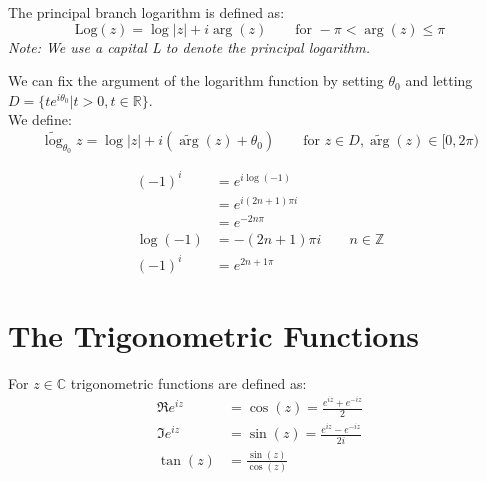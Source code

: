 \begin{definition}
    The principal branch logarithm is defined as:
    \[
        \text{Log}(z) = \log |z| + i \arg(z) \qquad \text{for } -\pi < \arg(z) \leq \pi
    \]
    \textit{Note: We use a capital L to denote the principal logarithm.}
\end{definition}

\begin{definition}
    We can fix the argument of the logarithm function by setting \(\theta_0\) and letting $D = \{ te^{i\theta_0} | t > 0, t \in \mathbb{R} \}$.\\
    We define:
    \[
        \widetilde{\log}_{\theta_0} z = \log |z| + i \left( \widetilde{\arg}(z) + \theta_0 \right) \qquad \text{for } z \in D, \widetilde{\arg}(z) \in [0, 2\pi)
    \]
\end{definition}

\begin{example}
    \begin{align}
        (-1)^i   & = e^{i \log(-1)}                         \\
                 & = e^{i (2n + 1)\pi i}                    \\
                 & = e^{-2n\pi}                             \\
        \log(-1) & = -(2n + 1)\pi i \qquad n \in \mathbb{Z} \\
        (-1)^i   & = e^{2n + 1\pi}
    \end{align}
\end{example}

\section{The Trigonometric Functions}
\begin{definition}
    For $z \in \mathbb{C}$ trigonometric functions are defined as:
    \begin{align}
        \Re{e^{iz}} & = \cos(z)  = \frac{e^{iz} + e^{-iz}}{2}  \\
        \Im{e^{iz}} & = \sin(z)  = \frac{e^{iz} - e^{-iz}}{2i} \\
        \tan(z)     & = \frac{\sin(z)}{\cos(z)}                \\
    \end{align}
\end{definition}

